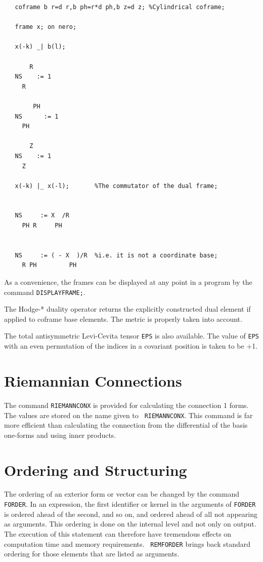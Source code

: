 \example{}

\begin{verbatim}
   coframe b r=d r,b ph=r*d ph,b z=d z; %Cylindrical coframe;

   frame x; on nero;

   x(-k) _| b(l);

       R
   NS    := 1
     R

        PH
   NS      := 1
     PH

       Z
   NS    := 1
     Z

   x(-k) |_ x(-l);       %The commutator of the dual frame;


   NS     := X  /R
     PH R     PH


   NS     := ( - X  )/R  %i.e. it is not a coordinate base;
     R PH         PH

\end{verbatim}

As a convenience, the frames can be displayed at any point in a program
by the command {\tt DISPLAYFRAME;}\label{DISPLAYFRAME}.

The Hodge-* duality operator returns the explicitly constructed dual
element if applied to coframe base elements. The metric is properly
taken into account.

The total antisymmetric Levi-Cevita tensor {\tt EPS}\label{EPS} is
also available.  The value of {\tt EPS} with an even permutation of the
indices in a covariant position is taken to be +1.


\section{Riemannian Connections}

The command {\tt RIEMANNCONX} is provided for calculating the
 \label{RIEMANNCONX}
connection 1 forms.  The values are stored on the name given to {\tt
RIEMANNCONX}.  This command is far more efficient than calculating the
connection from the differential of the basis one-forms and using
inner products.

\section{Ordering and Structuring}

The ordering of an exterior form or vector can be changed by the
command {\tt FORDER}.\label{FORDER}  In an expression, the first
identifier or kernel in the arguments of {\tt FORDER} is ordered ahead
of the second, and so on, and ordered ahead of all not appearing as
arguments.  This ordering is done on the internal level and not only
on output.  The execution of this statement can therefore have
tremendous effects on computation time and memory requirements.  {\tt
REMFORDER}\label{REMFORDER} brings back standard ordering for those
elements that are listed as arguments.

